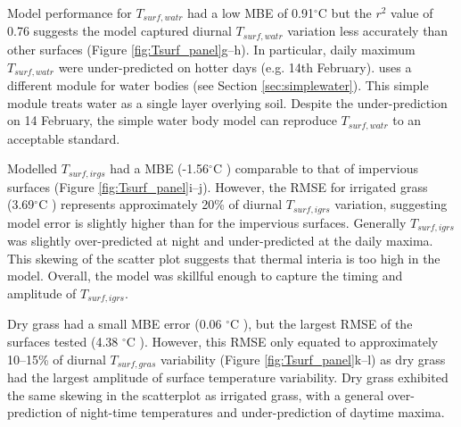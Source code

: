 \documentclass[final,3p,times,authoryear]{elsarticle}
\newcommand{\degreeC}{\ensuremath{^\circ}C }
\begin{document}



Model performance for  $T_{surf,watr}$ had a low MBE of 0.91\degreeC but the $r^{2}$ value of 0.76 suggests the model captured diurnal $T_{surf,watr}$  variation less accurately than other surfaces (Figure \ref{fig:Tsurf_panel}g--h). In particular, daily maximum $T_{surf,watr}$ were under-predicted on hotter days (e.g. 14th February).  uses a different module for water bodies (see Section \ref{sec:simplewater}). This simple module treats water as a single layer overlying soil. 
Despite the under-prediction on 14 February, the simple water body model can reproduce  $T_{surf,watr}$ to an acceptable standard. 

Modelled $T_{surf,irgs}$ had a MBE (-1.56\degreeC) comparable to that of impervious surfaces (Figure \ref{fig:Tsurf_panel}i--j). However, the RMSE for irrigated grass (3.69\degreeC) represents approximately 20\% of diurnal $T_{surf,igrs}$ variation, suggesting model error is slightly higher than for the impervious surfaces. Generally  $T_{surf,igrs}$ was slightly over-predicted at night  and under-predicted at the daily maxima. This skewing of the scatter plot suggests that thermal interia is too high in the model. Overall, the model was skillful enough to capture the timing and amplitude of  $T_{surf,igrs}$. 

Dry grass had a small MBE error (0.06 \degreeC), but the largest RMSE of the surfaces tested (4.38 \degreeC). However, this RMSE only equated to approximately 10--15\% of diurnal $T_{surf,gras}$ variability (Figure \ref{fig:Tsurf_panel}k--l) as dry grass had the largest amplitude of surface temperature variability. Dry grass exhibited the same skewing in the scatterplot as irrigated grass, with a general over-prediction of night-time temperatures and under-prediction of daytime maxima. 
\end{document}
